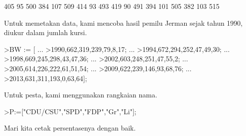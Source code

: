 \documentclass[a4paper,10pt]{article}
\begin{document}
\begin{eulernotebook}
\begin{eulercomment}
\begin{eulercomment}
\begin{euleroutput}
            405            95           500 
            384           107           509 
            414            93           493 
            419            90           491 
            394           101           505 
            382           103           515 
\end{euleroutput}
\begin{eulercomment}
Untuk memetakan data, kami mencoba hasil pemilu Jerman sejak tahun
1990, diukur dalam jumlah kursi.
\end{eulercomment}
\begin{eulerprompt}
>BW := [ ...
>1990,662,319,239,79,8,17; ...
>1994,672,294,252,47,49,30; ...
>1998,669,245,298,43,47,36; ...
>2002,603,248,251,47,55,2; ...
>2005,614,226,222,61,51,54; ...
>2009,622,239,146,93,68,76; ...
>2013,631,311,193,0,63,64];
\end{eulerprompt}
\begin{eulercomment}
Untuk pesta, kami menggunakan rangkaian nama.
\end{eulercomment}
\begin{eulerprompt}
>P:=["CDU/CSU","SPD","FDP","Gr","Li"];
\end{eulerprompt}
\begin{eulercomment}
Mari kita cetak persentasenya dengan baik.


\end{eulercomment}
\end{eulercomment}
\end{eulercomment}
\end{eulernotebook}
\end{document}
